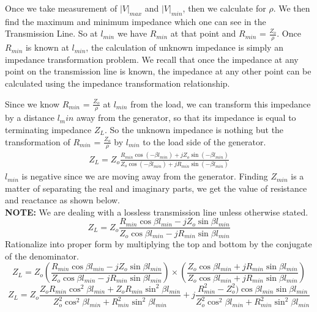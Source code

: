 Once we take measurement of $|V|_{max}$ and $|V|_{min}$, then we calculate for $ \rho $. We then find the maximum and minimum impedance which one can see in the Transmission Line. So at $l_{min}$ we have $R_{min}$ at that point and $R_{min}$ = $\frac{Z_o}{\rho}$. Once $R_{min}$ is known at $l_{min}$, the calculation of unknown impedance is simply an impedance transformation problem. We recall that once the impedance at any point on the transmission line is known, the impedance at any other point can be calculated using the impedance transformation relationship.

Since we know $R_{min}$ = $\frac{Z_o}{\rho}$ at $l_{min}$ from the load, we can transform this impedance by a distance $l_min$ away from the generator, so that its impedance is equal to terminating impedance $Z_{L}$. So the unknown impedance is nothing but the transformation of $R_{min}$ = $\frac{Z_o}{\rho}$ by $l_{min}$ to the load side of the generator. 
\begin{align}
Z_{L} = Z_o\frac{R_{min}\cos(-\beta l_{min}) + jZ_o\sin(-\beta l_{min})}{Z_o\cos(-\beta l_{min}) + jR_{min}\sin(-\beta l_{min})}
\end{align}
$l_{min}$ is negative since we are moving away from the generator. Finding $Z_{min}$ is a matter of separating the real and imaginary parts, we get the value of resistance and reactance as shown below.\\
\textbf{NOTE:} We are dealing with a lossless transmission line unless otherwise stated.
\begin{dmath}
Z_{L} = Z_o\frac{R_{min}\cos\beta l_{min} - jZ_o\sin\beta l_{min}}{Z_o\cos\beta l_{min} - jR_{min}\sin\beta l_{min}}
\end{dmath}
Rationalize into proper form by multiplying the top and bottom by the conjugate of the denominator.
{\footnotesize 
\begin{dmath}
Z_{L} = Z_o\left(\frac{R_{min}\cos\beta l_{min} - jZ_o\sin\beta l_{min}}{Z_o\cos\beta l_{min} - jR_{min}\sin\beta l_{min}}\right)\times\left(\frac{Z_o\cos\beta l_{min} + jR_{min}\sin\beta l_{min}}{Z_o\cos\beta l_{min} + jR_{min}\sin\beta l_{min}}\right)
\end{dmath}} 
{\footnotesize 
\begin{dmath}
Z_{L} = Z_o
\frac{Z_oR_{min}\cos^{2}\beta l_{min} + Z_oR_{min}\sin^{2}\beta l_{min}}{Z_o^{2}\cos^{2}\beta l_{min} + R_{min}^{2}\sin^{2}\beta l_{min}} +j\frac{R_{min}^{2}-Z_o^{2})\cos\beta l_{min}\sin\beta l_{min}}{Z_o^{2}\cos^{2}\beta l_{min} + R_{min}^{2}\sin^{2}\beta l_{min}}
\end{dmath}}
